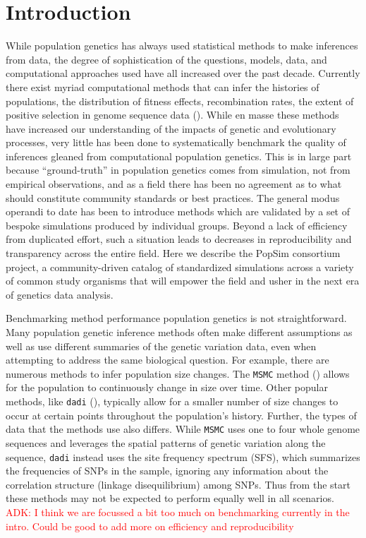 \documentclass[12pt,halfline,a4paper]{ouparticle}
\newcommand{\dadi}{\texttt{dadi} }
\newcommand{\MSMC}{\texttt{MSMC} }
\newcommand{\adk}[1]{\textcolor{red}{ADK: #1}}
\begin{document}
\section*{Introduction}
While population genetics has always used statistical methods to make inferences from data,
the degree of sophistication of the questions, models, data, and computational approaches
used have all increased over the past decade. Currently there exist myriad computational methods
that can infer the histories of populations, the distribution of fitness effects,
recombination rates, the extent of positive selection in genome sequence data
(\cite{li2011inference,schiffels2014inferring,terhorst2017robust,eyre2009estimating,kim2017inference,
chan2012genome,lin2013fast,Adrion662247,alachiotis2012omegaplus,degiorgio2016sweepfinder2,
kern2018diplos,sugden2018localization}).
While en masse these methods have increased our understanding of the
impacts of genetic and evolutionary processes, very little has been done to systematically
benchmark the quality of inferences gleaned from computational population genetics.
This is in large part because ``ground-truth'' in population genetics comes from simulation,
not from empirical observations, and as a field there has been no agreement as to what should
constitute community standards or best practices. The general modus operandi to date has been to
introduce methods which are validated by a set of bespoke simulations produced by individual
groups. Beyond a lack of efficiency from duplicated effort, such a situation leads
to decreases in reproducibility and transparency across the entire field.
Here we describe the PopSim consortium project, a community-driven catalog
of standardized simulations across a variety of common study organisms
that will empower the field and usher in the next era of genetics data analysis.

Benchmarking method performance population genetics is not straightforward.
Many population genetic inference methods often make different assumptions as
well as use different summaries of the genetic variation data, even when
attempting to address the same biological question. For example, there are
numerous methods to infer population size changes.
The \MSMC method (\cite{schiffels2014inferring}) allows for the
population to continuously change in size over time. Other popular methods, like
\dadi (\cite{gutenkunst2009inferring}), typically allow for a smaller number of size changes to occur at certain
points throughout the population's history. Further, the types of data that the
methods use also differs. While \MSMC uses one to four whole genome sequences and leverages the
spatial patterns of genetic variation along the sequence, \dadi  instead uses the
site frequency spectrum (SFS), which summarizes the frequencies of SNPs in the
sample, ignoring any information about the correlation structure (linkage
disequilibrium) among SNPs. Thus from the start these methods may not be
expected to perform equally well in all scenarios. \adk{I think we are focussed
a bit too much on benchmarking currently in the intro. Could be good to add more on efficiency
and reproducibility}
\end{document}
